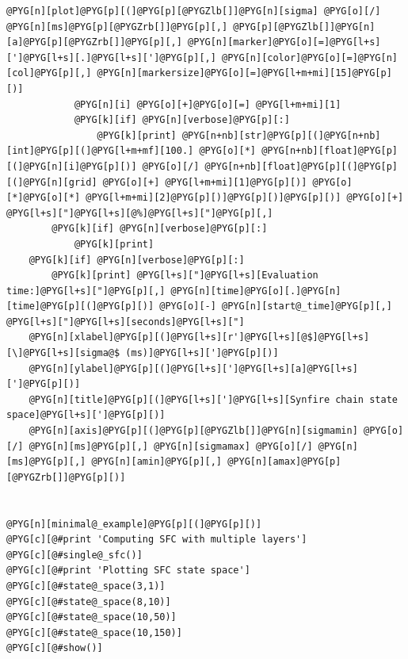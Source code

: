 \documentclass[letterpaper,10pt,english]{manual}
\begin{document}
\begin{Verbatim}[commandchars=@\[\]]
            @PYG[n][plot]@PYG[p][(]@PYG[p][@PYGZlb[]]@PYG[n][sigma] @PYG[o][/] @PYG[n][ms]@PYG[p][@PYGZrb[]]@PYG[p][,] @PYG[p][@PYGZlb[]]@PYG[n][a]@PYG[p][@PYGZrb[]]@PYG[p][,] @PYG[n][marker]@PYG[o][=]@PYG[l+s][']@PYG[l+s][.]@PYG[l+s][']@PYG[p][,] @PYG[n][color]@PYG[o][=]@PYG[n][col]@PYG[p][,] @PYG[n][markersize]@PYG[o][=]@PYG[l+m+mi][15]@PYG[p][)]
            @PYG[n][i] @PYG[o][+]@PYG[o][=] @PYG[l+m+mi][1]
            @PYG[k][if] @PYG[n][verbose]@PYG[p][:]
                @PYG[k][print] @PYG[n+nb][str]@PYG[p][(]@PYG[n+nb][int]@PYG[p][(]@PYG[l+m+mf][100.] @PYG[o][*] @PYG[n+nb][float]@PYG[p][(]@PYG[n][i]@PYG[p][)] @PYG[o][/] @PYG[n+nb][float]@PYG[p][(]@PYG[p][(]@PYG[n][grid] @PYG[o][+] @PYG[l+m+mi][1]@PYG[p][)] @PYG[o][*]@PYG[o][*] @PYG[l+m+mi][2]@PYG[p][)]@PYG[p][)]@PYG[p][)] @PYG[o][+] @PYG[l+s]["]@PYG[l+s][@%]@PYG[l+s]["]@PYG[p][,]
        @PYG[k][if] @PYG[n][verbose]@PYG[p][:]
            @PYG[k][print]
    @PYG[k][if] @PYG[n][verbose]@PYG[p][:]
        @PYG[k][print] @PYG[l+s]["]@PYG[l+s][Evaluation time:]@PYG[l+s]["]@PYG[p][,] @PYG[n][time]@PYG[o][.]@PYG[n][time]@PYG[p][(]@PYG[p][)] @PYG[o][-] @PYG[n][start@_time]@PYG[p][,] @PYG[l+s]["]@PYG[l+s][seconds]@PYG[l+s]["]
    @PYG[n][xlabel]@PYG[p][(]@PYG[l+s][r']@PYG[l+s][@$]@PYG[l+s][\]@PYG[l+s][sigma@$ (ms)]@PYG[l+s][']@PYG[p][)]
    @PYG[n][ylabel]@PYG[p][(]@PYG[l+s][']@PYG[l+s][a]@PYG[l+s][']@PYG[p][)]
    @PYG[n][title]@PYG[p][(]@PYG[l+s][']@PYG[l+s][Synfire chain state space]@PYG[l+s][']@PYG[p][)]
    @PYG[n][axis]@PYG[p][(]@PYG[p][@PYGZlb[]]@PYG[n][sigmamin] @PYG[o][/] @PYG[n][ms]@PYG[p][,] @PYG[n][sigmamax] @PYG[o][/] @PYG[n][ms]@PYG[p][,] @PYG[n][amin]@PYG[p][,] @PYG[n][amax]@PYG[p][@PYGZrb[]]@PYG[p][)]


@PYG[n][minimal@_example]@PYG[p][(]@PYG[p][)]
@PYG[c][@#print 'Computing SFC with multiple layers']
@PYG[c][@#single@_sfc()]
@PYG[c][@#print 'Plotting SFC state space']
@PYG[c][@#state@_space(3,1)]
@PYG[c][@#state@_space(8,10)]
@PYG[c][@#state@_space(10,50)]
@PYG[c][@#state@_space(10,150)]
@PYG[c][@#show()]
\end{Verbatim}

\resetcurrentobjects
\hypertarget{--doc-examples-frompapers_Izhikevich_2006_Polychronization}{}
\end{document}
